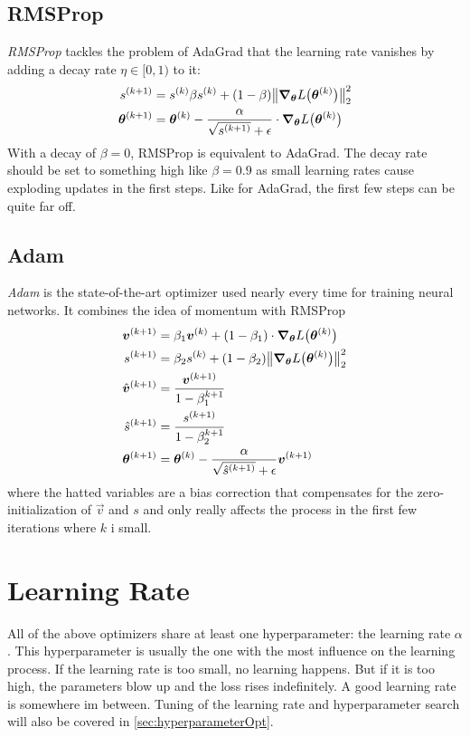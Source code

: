 		\subsection{RMSProp}
			\emph{RMSProp} tackles the problem of AdaGrad that the learning rate vanishes by adding a decay rate \(\eta \in [0, 1)\) to it:
			\begin{align}
				s^{(k + 1)} &= s^{(k)} \beta s^{(k)} + (1 - \beta) \big\lVert \grad_{\bm{\theta}} L\big(\bm{\theta}^{(k)}\big) \big\rVert_2^2 \\
				\bm{\theta}^{(k + 1)} &= \bm{\theta}^{(k)} - \frac{\alpha}{\sqrt{s^{(k + 1)}} + \epsilon} \cdot \grad_{\bm{\theta}} L\big(\bm{\theta}^{(k)}\big)
			\end{align}
			With a decay of \( \beta = 0 \), RMSProp is equivalent to AdaGrad. The decay rate should be set to something high like \( \beta = 0.9 \) as small learning rates cause exploding updates in the first steps. Like for AdaGrad, the first few steps can be quite far off.

		\subsection{Adam}
			\emph{Adam} is the state-of-the-art optimizer used nearly every time for training neural networks. It combines the idea of momentum with RMSProp
			\begin{align}
				\bm{v}^{(k + 1)} &= \beta_1 \bm{v}^{(k)} + (1 - \beta_1) \cdot \grad_{\bm{\theta}} L\big(\bm{\theta}^{(k)}\big) \\
				s^{(k + 1)} &= \beta_2 s^{(k)} + (1 - \beta_2) \big\lVert \grad_{\bm{\theta}} L\big(\bm{\theta}^{(k)}\big) \big\rVert_2^2 \\
				\hat{\bm{v}}^{(k + 1)} &= \frac{\bm{v}^{(k + 1)}}{1 - \beta_1^{k + 1}} \\
				\hat{s}^{(k + 1)} &= \frac{s^{(k + 1)}}{1 - \beta_2^{k + 1}} \\
				\bm{\theta}^{(k + 1)} &= \bm{\theta}^{(k)} - \frac{\alpha}{\sqrt{\hat{s}^{(k + 1)}} + \epsilon} \bm{v}^{(k + 1)}
			\end{align}
			where the hatted variables are a bias correction that compensates for the zero-initialization of \(\vec{v}\) and \(s\) and only really affects the process in the first few iterations where \(k\) i small.

	\section{Learning Rate}
		All of the above optimizers share at least one hyperparameter: the learning rate \(\alpha\). This hyperparameter is usually the one with the most influence on the learning process. If the learning rate is too small, no learning happens. But if it is too high, the parameters blow up and the loss rises indefinitely. A good learning rate is somewhere im between. Tuning of the learning rate and hyperparameter search will also be covered in \autoref{sec:hyperparameterOpt}.

